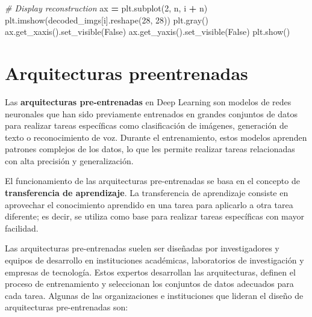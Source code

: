 \documentclass[
  a4paper,
  DIV=11,
  numbers=noendperiod]{scrreprt}
\newenvironment{Shaded}{\begin{snugshade}}{\end{snugshade}}
\newcommand{\CommentTok}[1]{\textcolor[rgb]{0.56,0.35,0.01}{\textit{#1}}}
\newcommand{\DecValTok}[1]{\textcolor[rgb]{0.00,0.00,0.81}{#1}}
\newcommand{\NormalTok}[1]{#1}
\newcommand{\OperatorTok}[1]{\textcolor[rgb]{0.81,0.36,0.00}{\textbf{#1}}}
\newcommand{\VariableTok}[1]{\textcolor[rgb]{0.00,0.00,0.00}{#1}}
\begin{document}
\begin{Shaded}
\begin{Highlighting}[numbers=left,,]
    \CommentTok{\# Display reconstruction}
\NormalTok{    ax }\OperatorTok{=}\NormalTok{ plt.subplot(}\DecValTok{2}\NormalTok{, n, i }\OperatorTok{+}\NormalTok{ n)}
\NormalTok{    plt.imshow(decoded\_imgs[i].reshape(}\DecValTok{28}\NormalTok{, }\DecValTok{28}\NormalTok{))}
\NormalTok{    plt.gray()}
\NormalTok{    ax.get\_xaxis().set\_visible(}\VariableTok{False}\NormalTok{)}
\NormalTok{    ax.get\_yaxis().set\_visible(}\VariableTok{False}\NormalTok{)}
\NormalTok{plt.show()}
\end{Highlighting}
\end{Shaded}

\section{Arquitecturas preentrenadas}\label{arquitecturas-preentrenadas}

Las \textbf{arquitecturas pre-entrenadas} en Deep Learning son modelos
de redes neuronales que han sido previamente entrenados en grandes
conjuntos de datos para realizar tareas específicas como clasificación
de imágenes, generación de texto o reconocimiento de voz. Durante el
entrenamiento, estos modelos aprenden patrones complejos de los datos,
lo que les permite realizar tareas relacionadas con alta precisión y
generalización.

El funcionamiento de las arquitecturas pre-entrenadas se basa en el
concepto de \textbf{transferencia de aprendizaje}. La transferencia de
aprendizaje consiste en aprovechar el conocimiento aprendido en una
tarea para aplicarlo a otra tarea diferente; es decir, se utiliza como
base para realizar tareas específicas con mayor facilidad.

Las arquitecturas pre-entrenadas suelen ser diseñadas por investigadores
y equipos de desarrollo en instituciones académicas, laboratorios de
investigación y empresas de tecnología. Estos expertos desarrollan las
arquitecturas, definen el proceso de entrenamiento y seleccionan los
conjuntos de datos adecuados para cada tarea. Algunas de las
organizaciones e instituciones que lideran el diseño de arquitecturas
pre-entrenadas son:
\end{document}
